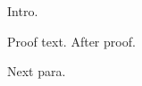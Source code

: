 \documentclass{article}\usepackage{amsthm}\newtheorem{thm}{Theorem}
\begin{document}
Intro.

{\proof Proof text.} After proof.

Next para.
\end{document}
